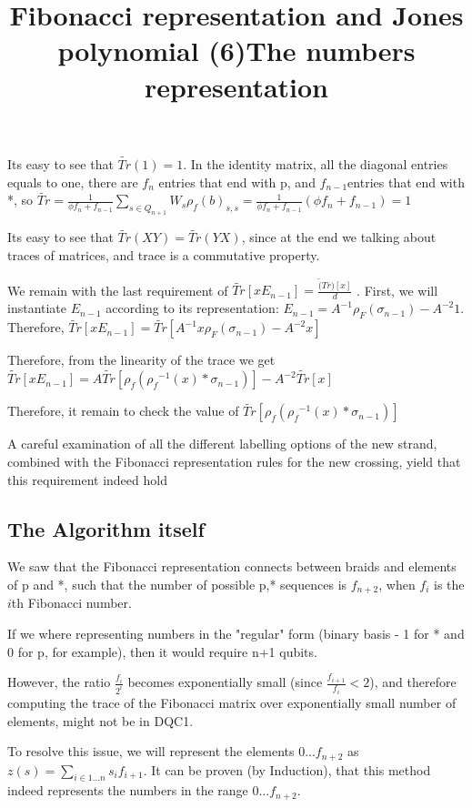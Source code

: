 \documentclass{article}
\begin{document}
Its easy to see that $\tilde{Tr}(1) = 1$. In the identity matrix, all the diagonal entries equals to one, there are $f_{n}$ entries that end with p, and $f_{n-1}$entries that end with *, so 
$\tilde{Tr} = \frac{1}{{\phi}f_{n}+f_{n-1}}\sum\limits_{s \in Q_{n+1}}{W_{s}}\rho_{f}(b)_{s,s} =
 \frac{1}{{\phi}f_{n}+f_{n-1}} ({\phi}f_{n}+f_{n-1}) = 1$


\title{Fibonacci representation and Jones polynomial (6)}
Its easy to see that $\tilde{Tr}(XY) = \tilde{Tr}(YX)$, since at the end we talking about traces of matrices, and trace is a commutative property.

We remain with the last requirement of  $ \tilde{Tr}[xE_{n-1}]=\frac{\tilde(Tr)[x]}{d}$ . First, we will instantiate $E_{n-1}$ according to its representation: $E_{n-1} = A^{-1}\rho_{F}(\sigma_{n-1}) - A^{-2}1$. Therefore, $ \tilde{Tr}[xE_{n-1}] = \tilde{Tr}[A^{-1}x\rho_{F}(\sigma_{n-1}) - A^{-2}x]$

Therefore, from the linearity of the trace we get  $ \tilde{Tr}[xE_{n-1}] = A\tilde{Tr}[{\rho_{f}({\rho_{f}}^{-1}(x) * \sigma_{n-1})}] -A^{-2}\tilde{Tr}[x]$

Therefore, it remain to check  the value of $\tilde{Tr}[{\rho_{f}({\rho_{f}}^{-1}(x) * \sigma_{n-1})}]$

A careful examination of all the different labelling options of the new strand, combined with the Fibonacci representation rules for the new crossing, yield that this requirement indeed hold


\subsection{The Algorithm itself}
\title{The numbers representation}
We saw that the Fibonacci representation connects between braids and elements of p and *, such that the number of possible p,* sequences is $f_{n+2}$, when $f_{i}$ is the $i$th Fibonacci number.

If we where representing numbers in the "regular" form (binary basis - 1 for * and 0 for p, for example), then it would require n+1 qubits. 

However, the ratio $\frac{f_{i}}{2^{i}}$ becomes exponentially small (since $\frac{f_{i+1}}{f_{i}} < 2 $), and therefore computing the trace of the Fibonacci matrix over exponentially small number of elements, might not be in DQC1.

To resolve this issue, we will represent the elements {0...$f_{n+2}$} as $z(s) = \sum\limits_{i \in {1...n}}{s_{i}f_{i+1}}$.
It can be proven (by Induction), that this method indeed represents the numbers in the range {0...$f_{n+2}$}. 
\end{document}
